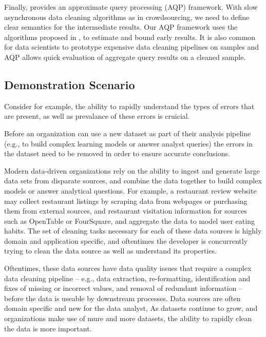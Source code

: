 Finally, \projx provides an approximate query processing (AQP) framework.
With slow asynchronous data cleaning algorithms as in crowdsourcing, we need 
to define clear semantics for the intermediate results.
Our AQP framework uses the algorithms proposed in \cite{wang1999sample}, to estimate and bound early results.
It is also common for data scientists to prototype expensive data cleaning pipelines on samples and AQP allows quick evaluation of
aggregate query results on a cleaned sample.

\subsection{Demonstration Scenario}

\fi




Consider for example, the ability to rapidly understand the types of errors that are present, as well as prevalance of 
these errors is cruicial.



Before an organization can use a new dataset as part of their analysis pipeline
(e.g., to build complex learning models or answer analyst queries)
the errors in the dataset need to be removed in order to ensure accurate conclusions.  

Modern data-driven organizations rely on the ability to ingest and generate large data sets from 
disparate sources, and combine the data together to build complex models or answer analytical questions.  
For example, a restaurant review website may collect restaurant listings by scraping data from webpages or purchasing them from external sources, and
restaurant visitation information for sources such as OpenTable or FourSquare, and aggregate the data to
model user eating habits.  
The set of cleaning tasks necessary for each of these data sources is highly domain and application specific,
and oftentimes the developer is concurrently trying to clean the data source as well as understand its properties.


Oftentimes, these data sources have data quality issues that require a complex data cleaning pipeline -- 
e.g., data extraction, re-formatting, identification and fixes of missing or incorrect values,
and removal of redundant information -- before the data is useable by downstream processes.
Data sources are often domain specific and new for the data analyst, 
As datasets continue to grow, and organizations make use of mure and more datasets, the ability to
rapidly clean the data is more important.  
\fi
